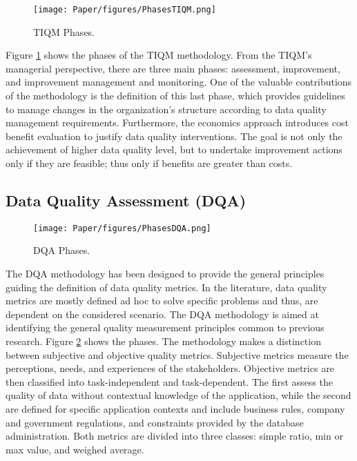 \documentclass[pdftex,english,oribibl]{llncs}
\begin{document}
\begin{figure}
    \centering
    \texttt{[image: Paper/figures/PhasesTIQM.png]}
    \caption{TIQM Phases.}
    \label{fig:PhasesTIQM}
 \end{figure}

Figure \ref{fig:PhasesTIQM} shows the phases of the TIQM methodology.
From the TIQM's managerial perspective, there are three main phases: assessment, improvement, and improvement management and monitoring.
One of the valuable contributions of the methodology is the definition of this last phase, which provides guidelines to manage changes in the organization’s structure according to data quality management requirements.
Furthermore, the economics approach introduces cost benefit evaluation to justify data quality interventions.
The goal is not only the achievement of higher data quality level, but to undertake improvement actions only if they are feasible; thus only if benefits are greater than costs.

\subsection{Data Quality Assessment (DQA)}
\begin{figure}
    \centering
    \texttt{[image: Paper/figures/PhasesDQA.png]}
    \caption{DQA Phases.}
    \label{fig:PhasesDQA}
 \end{figure}

The DQA methodology \cite{Pipino2002DQA} has been designed to provide the general principles guiding the definition of data quality metrics. In the literature, data quality metrics are mostly defined ad hoc to solve specific problems and thus, are dependent on the considered scenario. The DQA methodology is aimed at identifying the general quality measurement principles common to previous research. Figure \ref{fig:PhasesDQA} shows the phases.
The methodology makes a distinction between subjective and objective quality metrics. Subjective metrics measure the perceptions, needs, and experiences of the stakeholders. Objective metrics are then classified into task-independent and task-dependent. The first assess the quality of data without contextual knowledge of the application, while the second are defined for specific application contexts and include business rules, company and government regulations, and constraints provided by the database administration. Both metrics are divided into three classes: simple ratio, min or max value, and weighed average.
\end{document}
